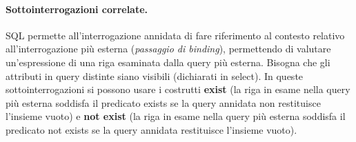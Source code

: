\paragraph{Sottointerrogazioni correlate.} SQL permette all’interrogazione annidata di fare riferimento al contesto relativo all’interrogazione più esterna (\textit{passaggio di binding}), permettendo di valutare un'espressione di una riga esaminata dalla query più esterna. Bisogna che gli attributi in query distinte siano visibili (dichiarati in select). In queste sottointerrogazioni si possono usare i costrutti \textbf{exist} (la riga in esame nella query più esterna soddisfa il predicato exists se la query annidata non restituisce l’insieme vuoto) e \textbf{not exist} (la riga in esame nella query più esterna soddisfa il predicato not exists se la query annidata restituisce l’insieme vuoto).